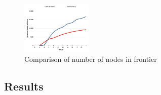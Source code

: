 \documentclass[Main]{subfiles}
\begin{document}
\begin{figure}[h!]
    \centering
    \includegraphics[width=0.3\textwidth]{nodes_in_frontier_compare.png}
    \caption{Comparison of number of nodes in frontier}
    \label{fig:node_frontier_comparison}
\end{figure}















\subsection{Results}
\end{document}
